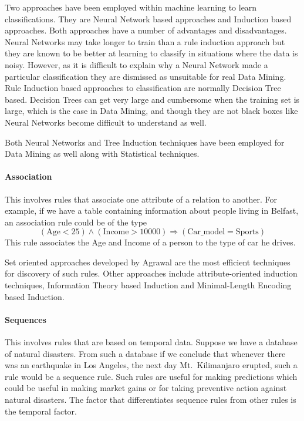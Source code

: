 \documentclass[a4paper,12pt,notitlepage,pdftex]{scrreprt}
\begin{document}
        Two approaches have been employed within machine learning to learn classifications.
        They are Neural Network based approaches and Induction based approaches.
        Both approaches have a number of advantages and disadvantages.
        Neural Networks may take longer to train than a rule induction approach but they are known to be better at
        learning to classify in situations where the data is noisy.
        However, as it is difficult to explain why a Neural Network made a particular classification they are
        dismissed as unsuitable for real Data Mining.
        Rule Induction based approaches to classification are normally Decision Tree based.
        Decision Trees can get very large and cumbersome when the training set is large, which is the case in Data
        Mining, and though they are not black boxes like Neural Networks become difficult to understand as well.

        Both Neural Networks and Tree Induction techniques have been employed for Data Mining as well along with
        Statistical techniques.

    \paragraph{Association}
        This involves rules that associate one attribute of a relation to another.
        For example, if we have a table containing information about people living in Belfast, an association rule
        could be of the type $$(\text{Age} < 25) \land (\text{Income} > 10000) \Rightarrow (\text{Car\_model} =
        \text{Sports})$$
        This rule associates the Age and Income of a person to the type of car he drives.

        Set oriented approaches developed by Agrawal are the most efficient techniques for discovery of such rules.
        Other approaches include attribute-oriented induction techniques, Information Theory based Induction and
        Minimal-Length Encoding based Induction.

    \paragraph{Sequences}
        This involves rules that are based on temporal data.
        Suppose we have a database of natural disasters.
        From such a database if we conclude that whenever there was an earthquake in Los Angeles, the next day
        Mt.~Kilimanjaro erupted, such a rule would be a sequence rule.
        Such rules are useful for making predictions which could be useful in making market gains or for taking
        preventive action against natural disasters.
        The factor that differentiates sequence rules from other rules is the temporal factor.
\end{document}

